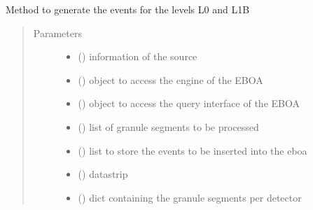 \begin{fulllineitems}
\label{\detokenize{s2boa.ingestions:s2boa.ingestions.functions.L0_L1A_L1B_processing}}
Method to generate the events for the levels L0 and L1B
\begin{quote}\begin{description}
\item[{Parameters}] \leavevmode\begin{itemize}
\item {} 
 () \textendash{} information of the source

\item {} 
 () \textendash{} object to access the engine of the EBOA

\item {} 
 () \textendash{} object to access the query interface of the EBOA

\item {} 
 () \textendash{} list of granule segments to be processed

\item {} 
 () \textendash{} list to store the events to be inserted into the eboa

\item {} 
 () \textendash{} datastrip

\item {} 
 () \textendash{} dict containing the granule segments per detector


\end{itemize}
\end{description}
\end{quote}
\end{fulllineitems}

